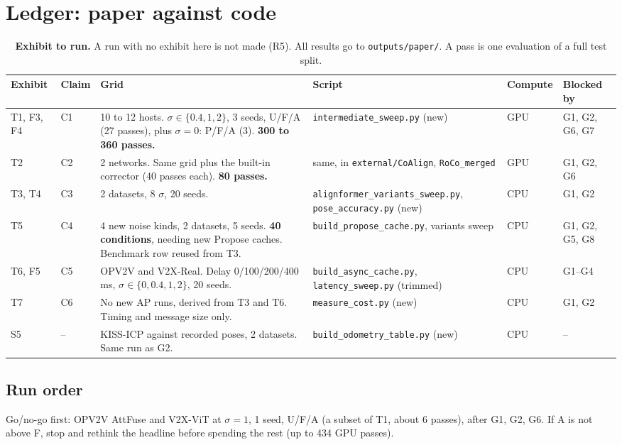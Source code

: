 \clearpage
\section*{Ledger: paper against code}

\begin{table}[t]
  \centering\footnotesize
  \caption{\textbf{Exhibit to run.} A run with no exhibit here is not made (R5). All results go to \texttt{outputs/paper/}. A pass is one evaluation of a full test split.}
  \begin{tabular}{@{}l l p{4.5cm} p{5.0cm} l p{2.3cm}@{}}
    \toprule
    Exhibit & Claim & Grid & Script & Compute & Blocked by \\
    \midrule
    T1, F3, F4 & C1 & 10 to 12 hosts. $\sigma\in\{0.4,1,2\}$, 3 seeds, U/F/A (27 passes), plus $\sigma=0$: P/F/A (3). \textbf{300 to 360 passes.} & \texttt{intermediate\_sweep.py} (new) & GPU & G1, G2, G6, G7 \\
    T2 & C2 & 2 networks. Same grid plus the built-in corrector (40 passes each). \textbf{80 passes.} & same, in \texttt{external/CoAlign}, \texttt{RoCo\_merged} & GPU & G1, G2, G6 \\
    T3, T4 & C3 & 2 datasets, 8 $\sigma$, 20 seeds. & \texttt{alignformer\_variants\_sweep.py}, \texttt{pose\_accuracy.py} (new) & CPU & G1, G2 \\
    T5 & C4 & 4 new noise kinds, 2 datasets, 5 seeds. \textbf{40 conditions}, needing new Propose caches. Benchmark row reused from T3. & \texttt{build\_propose\_cache.py}, variants sweep & CPU & G1, G2, G5, G8 \\
    T6, F5 & C5 & OPV2V and V2X-Real. Delay 0/100/200/400\,ms, $\sigma\in\{0,0.4,1,2\}$, 20 seeds. & \texttt{build\_async\_cache.py}, \texttt{latency\_sweep.py} (trimmed) & CPU & G1--G4 \\
    T7 & C6 & No new AP runs, derived from T3 and T6. Timing and message size only. & \texttt{measure\_cost.py} (new) & CPU & G1, G2 \\
    S5 & -- & KISS-ICP against recorded poses, 2 datasets. Same run as G2. & \texttt{build\_odometry\_table.py} (new) & CPU & -- \\
    \bottomrule
  \end{tabular}
\end{table}

\subsection*{Run order}
Go/no-go first: OPV2V AttFuse and V2X-ViT at $\sigma=1$, 1 seed, U/F/A (a subset of T1, about 6 passes), after G1, G2, G6. If A is not above F, stop and rethink the headline before spending the rest (up to 434 GPU passes).

